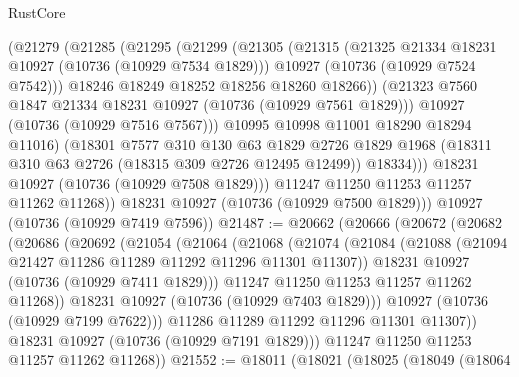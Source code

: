 \begin{lexlean}{RustCore}
\begin{coremodule}
              (@21279
                (@21285
                  (@21295
                    (@21299
                      (@21305
                        (@21315
                          (@21325 @21334 @18231 @10927 (@10736 (@10929 @7534 @1829)))
                          @10927
                          (@10736 (@10929 @7524 @7542)))
                        @18246
                        @18249
                        @18252
                        @18256
                        @18260
                        @18266))
                    (@21323 @7560 @1847 @21334 @18231 @10927 (@10736 (@10929 @7561 @1829)))
                    @10927
                    (@10736 (@10929 @7516 @7567)))
                  @10995
                  @10998
                  @11001
                  @18290
                  @18294
                  @11016)
                (@18301
                  @7577
                  @310
                  @130
                  @63
                  @1829
                  @2726
                  @1829
                  @1968
                  (@18311 @310 @63 @2726 (@18315 @309 @2726 @12495 @12499))
                  @18334)))
            @18231
            @10927
            (@10736 (@10929 @7508 @1829)))
          @11247
          @11250
          @11253
          @11257
          @11262
          @11268))
      @18231
      @10927
      (@10736 (@10929 @7500 @1829)))
    @10927
    (@10736 (@10929 @7419 @7596))
@21487 := @20662
    (@20666
      (@20672
        (@20682
          (@20686
            (@20692
              (@21054
                (@21064
                  (@21068
                    (@21074
                      (@21084
                        (@21088 (@21094 @21427 @11286 @11289 @11292 @11296 @11301 @11307))
                        @18231
                        @10927
                        (@10736 (@10929 @7411 @1829)))
                      @11247
                      @11250
                      @11253
                      @11257
                      @11262
                      @11268))
                  @18231
                  @10927
                  (@10736 (@10929 @7403 @1829)))
                @10927
                (@10736 (@10929 @7199 @7622)))
              @11286
              @11289
              @11292
              @11296
              @11301
              @11307))
          @18231
          @10927
          (@10736 (@10929 @7191 @1829)))
        @11247
        @11250
        @11253
        @11257
        @11262
        @11268))
@21552 := @18011
    (@18021
      (@18025
        (@18049
          (@18064

\end{coremodule}
\end{lexlean}
